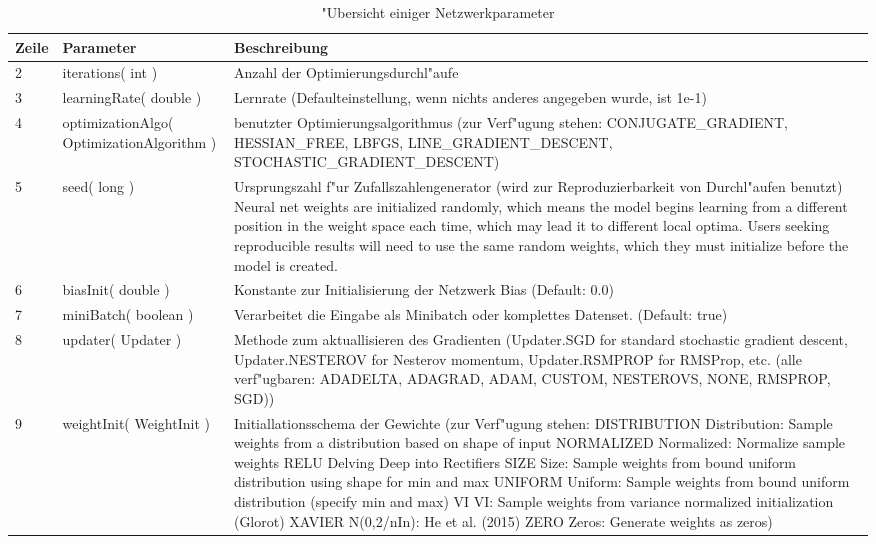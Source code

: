 {\begin{table}
\begin{tabular}{|p{0.8cm}|p{3.7cm}|p{8.8cm}|}\hline
   \textbf{Zeile} & \textbf{Parameter} & \textbf{Beschreibung} \\ \hline
   2 & iterations( int ) & Anzahl der Optimierungsdurchl"aufe \\ \hline
   3 & learningRate( double ) & Lernrate (Defaulteinstellung, wenn nichts anderes angegeben wurde, ist 1e-1) \\ \hline
   4 & optimizationAlgo( OptimizationAlgorithm ) & benutzter Optimierungsalgorithmus (zur Verf"ugung stehen: CONJUGATE\_GRADIENT, HESSIAN\_FREE, LBFGS, LINE\_GRADIENT\_DESCENT, STOCHASTIC\_GRADIENT\_DESCENT) \\ \hline
  5 & seed( long ) & Ursprungszahl f"ur Zufallszahlengenerator (wird zur Reproduzierbarkeit von Durchl"aufen benutzt) Neural net weights are initialized randomly, which means the model begins learning from a different position in the weight space each time, which may lead it to different local optima. Users seeking reproducible results will need to use the same random weights, which they must initialize before the model is created. \\ \hline
  6 & biasInit( double ) & Konstante zur Initialisierung der Netzwerk Bias (Default: 0.0) \\ \hline
  7 & miniBatch( boolean ) & Verarbeitet die Eingabe als Minibatch oder komplettes Datenset. (Default: true) \\ \hline
  8 & updater( Updater ) & Methode zum aktuallisieren des Gradienten (Updater.SGD for standard stochastic gradient descent, Updater.NESTEROV for Nesterov momentum, Updater.RSMPROP for RMSProp, etc. (alle verf"ugbaren: ADADELTA, ADAGRAD, ADAM, CUSTOM, NESTEROVS, NONE, RMSPROP, SGD)) \\ \hline
   9 & weightInit( WeightInit ) & Initiallationsschema der Gewichte
(zur Verf"ugung stehen:
DISTRIBUTION Distribution: Sample weights from a distribution based on shape of input
NORMALIZED Normalized: Normalize sample weights
RELU Delving Deep into Rectifiers
SIZE Size: Sample weights from bound uniform distribution using shape for min and max
UNIFORM Uniform: Sample weights from bound uniform distribution (specify min and max)
VI VI: Sample weights from variance normalized initialization (Glorot)
XAVIER N(0,2/nIn): He et al. (2015)
ZERO Zeros: Generate weights as zeros) \\ \hline
 \end{tabular}
\caption{"Ubersicht einiger Netzwerkparameter}
\label{tbl:beispieltabelle} %
\end{table}

}
